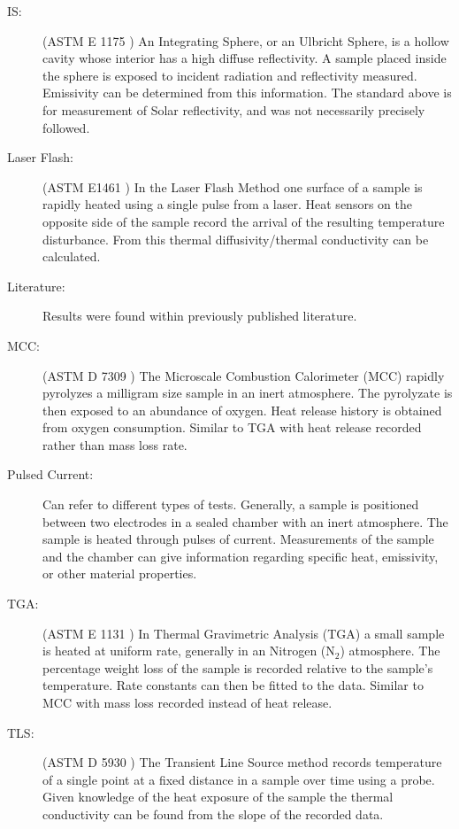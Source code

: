 \begin{description}
\item[IS:] (ASTM E 1175 \cite{intgsphere}) An Integrating Sphere, or an Ulbricht Sphere, is a hollow cavity whose interior has a high diffuse reflectivity. A sample placed inside the sphere is exposed to incident radiation and reflectivity measured. Emissivity can be determined from this information. The standard above is for measurement of Solar reflectivity, and was not necessarily precisely followed.
\item[Laser Flash:] (ASTM E1461 \cite{laserflash}) In the Laser Flash Method one surface of a sample is rapidly heated using a single pulse from a laser. Heat sensors on the opposite side of the sample record the arrival of the resulting temperature disturbance. From this thermal diffusivity/thermal conductivity can be calculated.
\item[Literature:] Results were found within previously published literature.
\item[MCC:] (ASTM D 7309 \cite{microcc}) The Microscale Combustion Calorimeter (MCC)  rapidly pyrolyzes a milligram size sample in an inert atmosphere. The pyrolyzate is then exposed to an abundance of oxygen.  Heat release history is obtained from oxygen consumption. Similar to TGA with  heat release recorded rather than mass loss rate.
\item[Pulsed Current:] Can refer to different types of tests. Generally, a sample is positioned between two electrodes in a sealed chamber with an inert atmosphere. The sample is heated through pulses of current. Measurements of the sample and the chamber can give information regarding specific heat, emissivity, or other material properties.
\item[TGA:] (ASTM E 1131 \cite{thermalga}) In Thermal Gravimetric Analysis (TGA)  a small sample is heated at uniform rate, generally in an Nitrogen (N$_2$) atmosphere. The percentage weight loss of the sample is recorded relative to the sample's temperature. Rate constants can then be fitted to the data. Similar to MCC with mass loss recorded instead of heat release.
\item[TLS:] (ASTM D 5930 \cite{transline}) The Transient Line Source method records temperature of a single point at a fixed distance in a sample over time using a probe. Given knowledge of the heat exposure of the sample the thermal conductivity can be found from the slope of the recorded data.
\end{description}




\clearpage

